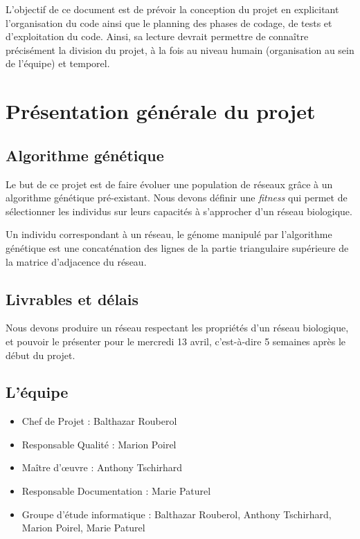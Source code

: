 


\maketitle

L'objectif de ce document est de prévoir la conception du projet en explicitant l'organisation du code ainsi que le planning des phases de codage, de tests et d'exploitation du code. Ainsi, sa lecture devrait permettre de connaître précisément la division du projet, à la fois au niveau humain (organisation au sein de l'équipe) et temporel.

\section{Présentation générale du projet}

\subsection{Algorithme génétique}
Le but de ce projet est de faire évoluer une population de réseaux grâce à un algorithme génétique pré-existant. Nous devons définir une \textit{fitness} qui permet de sélectionner les individus sur leurs capacités à s'approcher d'un réseau biologique.

Un individu correspondant à un réseau, le génome manipulé par l'algorithme génétique est une concaténation des lignes de la partie triangulaire supérieure de la matrice d'adjacence du réseau.

\subsection{Livrables et délais}
Nous devons produire un réseau respectant les propriétés d'un réseau biologique, et pouvoir le présenter pour le mercredi 13 avril, c'est-à-dire 5 semaines après le début du projet.

\subsection{L'équipe}
\begin{itemize}
\item Chef de Projet : Balthazar Rouberol
\item Responsable Qualité : Marion Poirel
\item Ma\^itre d'œuvre : Anthony Tschirhard
\item Responsable Documentation : Marie Paturel
\item Groupe d'étude informatique : Balthazar Rouberol, Anthony Tschirhard, Marion Poirel, Marie Paturel
\end{itemize}



